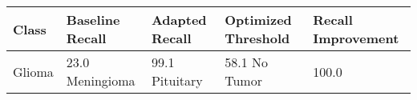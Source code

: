 \begin{tabular}{lllll}
\toprule
Class & Baseline Recall & Adapted Recall & Optimized Threshold & Recall Improvement \\
\midrule
Glioma & 23.0%
Meningioma & 99.1%
Pituitary & 58.1%
No Tumor & 100.0%
\bottomrule
\end{tabular}



